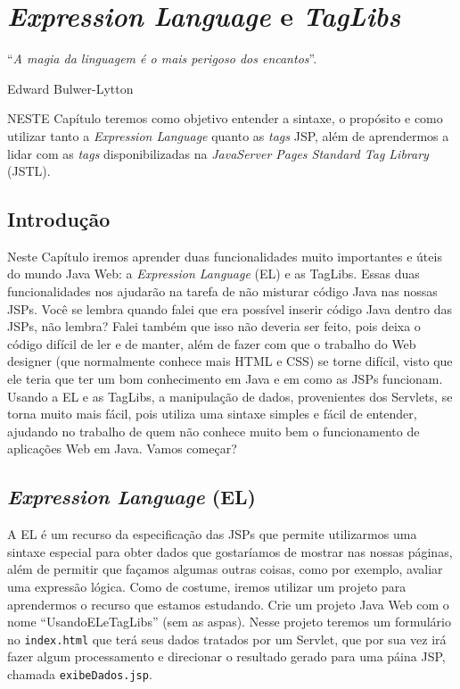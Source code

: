 \chapter{\textit{Expression Language} e \textit{TagLibs}}\label{cap:elTagLibs}
\epigraph{``\textit{A magia da linguagem é o mais perigoso dos encantos}''.}{Edward Bulwer-Lytton}

\lettrine[lines=4, lhang=0.1, lraise=0, loversize=0.2, findent=0.1em]{\textcolor{corAzulTema}{N}}{ESTE} Capítulo teremos como objetivo entender a sintaxe, o propósito e como utilizar tanto a \textit{Expression Language} quanto as \textit{tags} JSP, além de aprendermos a lidar com as \textit{tags} disponibilizadas na \textit{JavaServer Pages Standard Tag Library} (JSTL).


\section{Introdução}

Neste Capítulo iremos aprender duas funcionalidades muito importantes e úteis do mundo Java Web: a \textit{Expression Language} (EL) e as TagLibs. Essas duas funcionalidades nos ajudarão na tarefa de não misturar código Java nas nossas JSPs. Você se lembra quando falei que era possível inserir código Java dentro das JSPs, não lembra? Falei também que isso não deveria ser feito, pois deixa o código difícil de ler e de manter, além de fazer com que o trabalho do Web designer (que normalmente conhece mais HTML e CSS) se torne difícil, visto que ele teria que ter um bom conhecimento em Java e em como as JSPs funcionam. Usando a EL e as TagLibs, a manipulação de dados, provenientes dos Servlets, se torna muito mais fácil, pois utiliza uma sintaxe simples e fácil de entender, ajudando no trabalho de quem não conhece muito bem o funcionamento de aplicações Web em Java. Vamos começar?


\section{\textit{Expression Language} (EL)}

A EL é um recurso da especificação das JSPs que permite utilizarmos uma sintaxe especial para obter dados que gostaríamos de mostrar nas nossas páginas, além de permitir que façamos algumas outras coisas, como por exemplo, avaliar uma expressão lógica. Como de costume, iremos utilizar um projeto para aprendermos o recurso que estamos estudando. Crie um projeto Java Web com o nome ``UsandoELeTagLibs'' (sem as aspas). Nesse projeto teremos um formulário no \texttt{index.html} que terá seus dados tratados por um Servlet, que por sua vez irá fazer algum processamento e direcionar o resultado gerado para uma páina JSP, chamada \texttt{exibeDados.jsp}.


